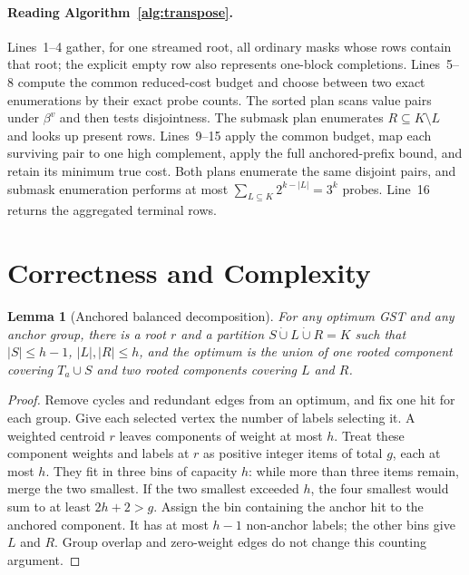 \documentclass[sigconf,nonacm]{acmart}
\newtheorem{lemma}{Lemma}
\begin{document}
\paragraph{Reading Algorithm~\ref{alg:transpose}.}
Lines~1--4 gather, for one streamed root, all ordinary masks whose rows contain that root; the explicit empty row also represents one-block completions.  Lines~5--8 compute the common reduced-cost budget and choose between two exact enumerations by their exact probe counts.  The sorted plan scans value pairs under $\beta^v$ and then tests disjointness.  The submask plan enumerates $R\subseteq K\setminus L$ and looks up present rows.  Lines~9--15 apply the common budget, map each surviving pair to one high complement, apply the full anchored-prefix bound, and retain its minimum true cost.  Both plans enumerate the same disjoint pairs, and submask enumeration performs at most $\sum_{L\subseteq K}2^{k-|L|}=3^k$ probes.  Line~16 returns the aggregated terminal rows.

\section{Correctness and Complexity}
\label{sec:analysis}

\begin{lemma}[Anchored balanced decomposition]
\label{lem:balanced}
For any optimum GST and any anchor group, there is a root $r$ and a partition $S\mathbin{\dot\cup}L\mathbin{\dot\cup}R=K$ such that $|S|\leq h-1$, $|L|,|R|\leq h$, and the optimum is the union of one rooted component covering $T_a\cup S$ and two rooted components covering $L$ and $R$.
\end{lemma}
\begin{proof}
Remove cycles and redundant edges from an optimum, and fix one hit for each group.  Give each selected vertex the number of labels selecting it.  A weighted centroid $r$ leaves components of weight at most $h$.  Treat these component weights and labels at $r$ as positive integer items of total $g$, each at most $h$.  They fit in three bins of capacity $h$: while more than three items remain, merge the two smallest.  If the two smallest exceeded $h$, the four smallest would sum to at least $2h+2>g$.  Assign the bin containing the anchor hit to the anchored component.  It has at most $h-1$ non-anchor labels; the other bins give $L$ and $R$.  Group overlap and zero-weight edges do not change this counting argument.
\end{proof}
\end{document}
